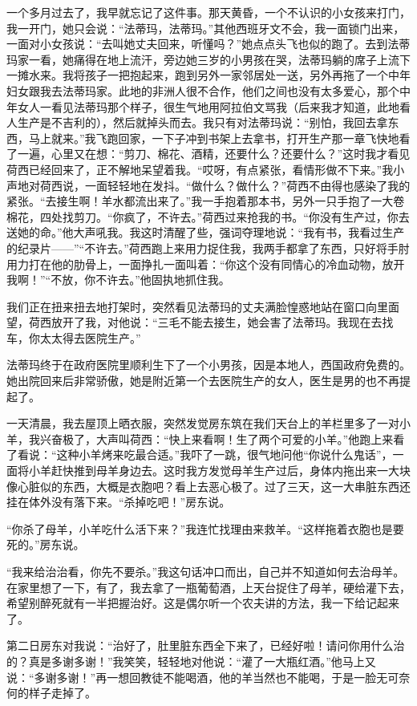 \par 一个多月过去了，我早就忘记了这件事。那天黄昏，一个不认识的小女孩来打门，我一开门，她只会说：“法蒂玛，法蒂玛。”其他西班牙文不会，我一面锁门出来，一面对小女孩说：“去叫她丈夫回来，听懂吗？”她点点头飞也似的跑了。去到法蒂玛家一看，她痛得在地上流汗，旁边她三岁的小男孩在哭，法蒂玛躺的席子上流下一摊水来。我将孩子一把抱起来，跑到另外一家邻居处一送，另外再拖了一个中年妇女跟我去法蒂玛家。此地的非洲人很不合作，他们之间也没有太多爱心，那个中年女人一看见法蒂玛那个样子，很生气地用阿拉伯文骂我（后来我才知道，此地看人生产是不吉利的），然后就掉头而去。我只有对法蒂玛说：“别怕，我回去拿东西，马上就来。”我飞跑回家，一下子冲到书架上去拿书，打开生产那一章飞快地看了一遍，心里又在想：“剪刀、棉花、酒精，还要什么？还要什么？”这时我才看见荷西已经回来了，正不解地呆望着我。“哎呀，有点紧张，看情形做不下来。”我小声地对荷西说，一面轻轻地在发抖。“做什么？做什么？”荷西不由得也感染了我的紧张。“去接生啊！羊水都流出来了。”我一手抱着那本书，另外一只手抱了一大卷棉花，四处找剪刀。“你疯了，不许去。”荷西过来抢我的书。“你没有生产过，你去送她的命。”他大声吼我。我这时清醒了些，强词夺理地说：“我有书，我看过生产的纪录片——”“不许去。”荷西跑上来用力捉住我，我两手都拿了东西，只好将手肘用力打在他的肋骨上，一面挣扎一面叫着：“你这个没有同情心的冷血动物，放开我啊！”“不放，你不许去。”他固执地抓住我。
\par 我们正在扭来扭去地打架时，突然看见法蒂玛的丈夫满脸惶惑地站在窗口向里面望，荷西放开了我，对他说：“三毛不能去接生，她会害了法蒂玛。我现在去找车，你太太得去医院生产。”
\par 法蒂玛终于在政府医院里顺利生下了一个小男孩，因是本地人，西国政府免费的。她出院回来后非常骄傲，她是附近第一个去医院生产的女人，医生是男的也不再提起了。
\par 一天清晨，我去屋顶上晒衣服，突然发觉房东筑在我们天台上的羊栏里多了一对小羊，我兴奋极了，大声叫荷西：“快上来看啊！生了两个可爱的小羊。”他跑上来看了看说：“这种小羊烤来吃最合适。”我吓了一跳，很气地问他“你说什么鬼话”，一面将小羊赶快推到母羊身边去。这时我方发觉母羊生产过后，身体内拖出来一大块像心脏似的东西，大概是衣胞吧？看上去恶心极了。过了三天，这一大串脏东西还挂在体外没有落下来。“杀掉吃吧！”房东说。
\par “你杀了母羊，小羊吃什么活下来？”我连忙找理由来救羊。“这样拖着衣胞也是要死的。”房东说。
\par “我来给治治看，你先不要杀。”我这句话冲口而出，自己并不知道如何去治母羊。在家里想了一下，有了，我去拿了一瓶葡萄酒，上天台捉住了母羊，硬给灌下去，希望别醉死就有一半把握治好。这是偶尔听一个农夫讲的方法，我一下给记起来了。
\par 第二日房东对我说：“治好了，肚里脏东西全下来了，已经好啦！请问你用什么治的？真是多谢多谢！”我笑笑，轻轻地对他说：“灌了一大瓶红酒。”他马上又说：“多谢多谢！”再一想回教徒不能喝酒，他的羊当然也不能喝，于是一脸无可奈何的样子走掉了。
